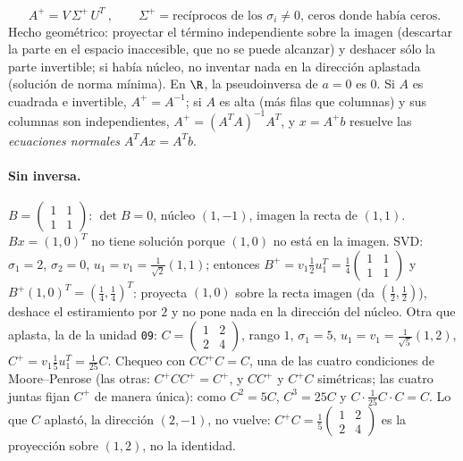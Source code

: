 \begin{resultado}
\[
  \boxed{\ A^{+}=V\,\Sigma^{+}\,U^T\ },\qquad
  \Sigma^{+}=\text{recíprocos de los }\sigma_i\neq0\text{, ceros donde había ceros}.
\]
Hecho geométrico: proyectar el término independiente sobre la imagen (descartar la parte
en el espacio inaccesible, que no se puede alcanzar) y deshacer sólo la parte invertible;
si había núcleo, no inventar nada en la dirección aplastada (solución de norma mínima).
En \(\R\), la pseudoinversa de \(a=0\) es \(0\). Si \(A\) es cuadrada e invertible,
\(A^{+}=A^{-1}\); si \(A\) es alta (más filas que columnas) y sus columnas son
independientes, \(A^{+}=(A^TA)^{-1}A^T\), y \(x=A^{+}b\) resuelve las \emph{ecuaciones
normales} \(A^TAx=A^Tb\).
\end{resultado}

\paragraph{Sin inversa.} \(B=\begin{pmatrix}1&1\\1&1\end{pmatrix}\): \(\det B=0\), núcleo
\((1,-1)\), imagen la recta de \((1,1)\). \(Bx=(1,0)^T\) no tiene solución porque \((1,0)\)
no está en la imagen. SVD: \(\sigma_1=2\), \(\sigma_2=0\), \(u_1=v_1=\tfrac1{\sqrt2}(1,1)\);
entonces \(B^{+}=v_1\tfrac12u_1^T=\tfrac14\begin{pmatrix}1&1\\1&1\end{pmatrix}\) y
\(B^{+}(1,0)^T=(\tfrac14,\tfrac14)^T\): proyecta \((1,0)\) sobre la recta imagen (da
\((\tfrac12,\tfrac12)\)), deshace el estiramiento por \(2\) y no pone nada en la dirección
del núcleo. Otra que aplasta, la de la unidad \texttt{09}:
\(C=\begin{pmatrix}1&2\\2&4\end{pmatrix}\), rango \(1\), \(\sigma_1=5\),
\(u_1=v_1=\tfrac1{\sqrt5}(1,2)\), \(C^{+}=v_1\tfrac15u_1^T=\tfrac1{25}C\). Chequeo con
\(CC^{+}C=C\), una de las cuatro condiciones de Moore--Penrose (las otras:
\(C^{+}CC^{+}=C^{+}\), y \(CC^{+}\) y \(C^{+}C\) simétricas; las cuatro juntas fijan
\(C^{+}\) de manera única): como \(C^2=5C\), \(C^3=25C\) y
\(C\cdot\tfrac1{25}C\cdot C=C\). Lo que \(C\) aplastó, la dirección \((2,-1)\), no vuelve:
\(C^{+}C=\tfrac15\begin{pmatrix}1&2\\2&4\end{pmatrix}\) es la proyección sobre \((1,2)\),
no la identidad.

